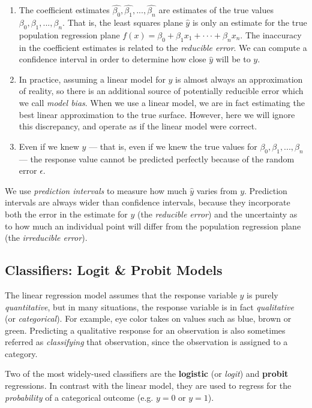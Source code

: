 \begin{enumerate}
    \item The coefficient estimates $\hat{\beta_0}, \hat{\beta_1}, ..., \hat{\beta_n}$ are estimates of the true values $\beta_0, \beta_1, ..., \beta_n$. That is, the least squares plane $\hat{y}$ is only an estimate for the true population regression plane $f(x) = \beta_0 + \beta_1 x_1 + ··· + \beta_n x_n$. The inaccuracy in the coefficient estimates is related to the \textit{reducible error}. We can compute a confidence interval in order to determine how close $\hat{y}$ will be to $y$.

    \item In practice, assuming a linear model for $y$ is almost always an approximation of reality, so there is an additional source of potentially reducible error which we call \textit{model bias}. When we use a linear model, we are in fact estimating the best linear approximation to the true surface. However, here we will ignore this discrepancy, and operate as if the linear model were correct.

    \item Even if we knew $y$ --- that is, even if we knew the true values for $\beta_0, \beta_1, ..., \beta_n$ --- the response value cannot be predicted perfectly because of the random error $\epsilon$.
\end{enumerate}

We use \textit{prediction intervals} to measure how much $\hat{y}$ varies from $y$. Prediction intervals are always wider than confidence intervals, because they incorporate both the error in the estimate for $y$ (the \textit{reducible error}) and the uncertainty as to how much an individual point will differ from the population regression plane (the \textit{irreducible error}).


\subsection{Classifiers: Logit \& Probit Models}
The linear regression model assumes that the response variable $y$ is purely \textit{quantitative}, but in many situations, the response variable is in fact \textit{qualitative} (or \textit{categorical}). For example, eye color takes on values such as blue, brown or green. Predicting a qualitative response for an observation is also sometimes referred as \textit{classifying} that observation, since the observation is assigned to a category.

Two of the most widely-used classifiers are the \textbf{logistic} (or \textit{logit}) and \textbf{probit} regressions. In contrast with the linear model, they are used to regress for the \textit{probability} of a categorical outcome (e.g. $y=0$ or $y=1$).

